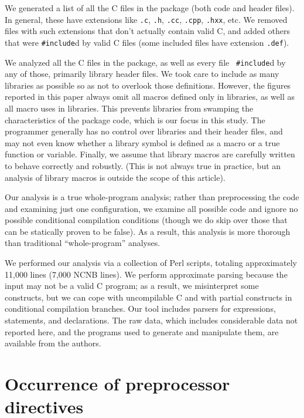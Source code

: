 \documentclass[10pt]{article}
\def\typeofdocument{article}
\newcommand{\file}[1]{\texttt{#1}}
\begin{document}
We generated a list of all the C files in the package (both code and header
files).  In general, these have extensions like \file{.c}, \file{.h},
\file{.cc}, \file{.cpp}, \file{.hxx}, etc.  We removed files with such
extensions that don't actually contain valid C, and added others that were
{\tt \#include}d by valid C files (some included files have extension
\file{.def}).

We analyzed all the C files in the package, as well as every file {\tt
\#include}d by any of those, primarily library header files.  We
took care to include as many libraries as possible so as not to overlook
those definitions.  However, the figures reported in this paper always omit
all macros defined only in libraries, as well as all macro uses in
libraries.  This prevents libraries from swamping the characteristics of
the package code, which is our focus in this study.  The programmer
generally has no control over libraries and their header files, and may not
even know whether a library symbol is defined as a macro or a true function
or variable.  Finally, we assume that library macros are carefully written
to behave correctly and robustly.  (This is not always true in practice,
but an analysis of library macros is outside the scope of this
\typeofdocument).

Our analysis is a true whole-program analysis; rather than preprocessing the
code and examining just one configuration, we examine all possible code and
ignore no possible  conditional compilation conditions (though we do skip
over those that can be statically proven to be false).   As a result, this
analysis is more thorough than traditional ``whole-program'' analyses.


We performed our analysis via a collection of Perl scripts, totaling
approximately 11,000 lines (7,000 NCNB lines).  We perform approximate
parsing because the input may not be a valid C program; as a result, we
misinterpret some constructs, but we can cope with uncompilable C and with
partial constructs in conditional compilation branches.  Our tool includes
parsers for expressions, statements, and declarations.  The raw data, which
includes considerable data not reported here, and the programs used to
generate and manipulate them, are available from the authors.


\section{Occurrence of preprocessor directives}
\label{sec:directives}
\label{sec:first-content-section}
\end{document}
